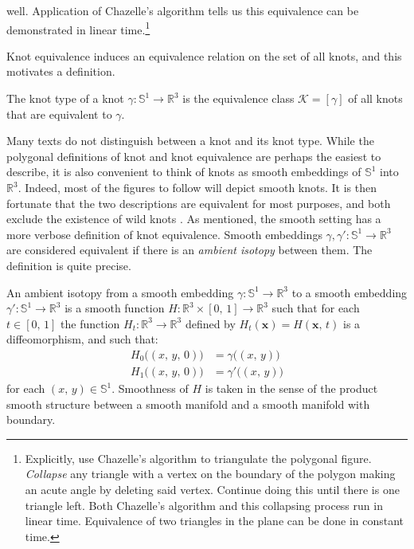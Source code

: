     well. Application of Chazelle's algorithm
    \cite{ChazelleTriangulationAlgorithm} tells us this equivalence
    can be demonstrated in linear time.\footnote{%
        Explicitly, use Chazelle's algorithm to triangulate the polygonal
        figure. \textit{Collapse} any triangle with a vertex on the boundary
        of the polygon making an acute angle by deleting said vertex.
        Continue doing this until there is one triangle left.
        Both Chazelle's algorithm and this collapsing
        process run in linear time. Equivalence of two triangles in the
        plane can be done in constant time.
    }
    \par\hfill\par
    Knot equivalence induces an equivalence relation on the set of all knots,
    and this motivates a definition.
    \begin{definition}
        The knot type of a knot $\gamma:\mathbb{S}^{1}\rightarrow\mathbb{R}^{3}$
        is the equivalence class $\mathcal{K}=[\gamma]$ of all knots that are
        equivalent to $\gamma$.
    \end{definition}
    Many texts do not distinguish between a knot and its knot type.
    While the polygonal definitions of knot and knot equivalence are perhaps
    the easiest to describe, it is also convenient to think of knots as smooth
    embeddings of $\mathbb{S}^{1}$ into $\mathbb{R}^{3}$. Indeed, most of the
    figures to follow will depict smooth knots. It is then fortunate that the
    two descriptions are equivalent for most purposes, and both exclude the
    existence of wild knots \cite[p.~147]{CrowellFoxKnotTheory}. As mentioned,
    the smooth setting has a more verbose definition of knot equivalence.
    Smooth embeddings $\gamma,\gamma':\mathbb{S}^{1}\rightarrow\mathbb{R}^{3}$
    are considered equivalent if there is an \textit{ambient isotopy}
    between them. The definition is quite precise.
    \begin{definition}
        An ambient isotopy from a smooth embedding
        $\gamma:\mathbb{S}^{1}\rightarrow\mathbb{R}^{3}$ to a smooth
        embedding $\gamma':\mathbb{S}^{1}\rightarrow\mathbb{R}^{3}$ is a
        smooth function
        $H:\mathbb{R}^{3}\times[0,\,1]\rightarrow\mathbb{R}^{3}$
        such that for each $t\in[0,\,1]$ the function
        $H_{t}:\mathbb{R}^{3}\rightarrow\mathbb{R}^{3}$ defined by
        $H_{t}(\mathbf{x})=H(\mathbf{x},\,t)$ is a diffeomorphism,
        and such that:
        \begin{subequations}
            \begin{align}
                H_{0}\big((x,\,y,\,0)\big)&=\gamma\big((x,\,y)\big)\\
                H_{1}\big((x,\,y,\,0)\big)&=\gamma'\big((x,\,y)\big)
            \end{align}
        \end{subequations}
        for each $(x,\,y)\in\mathbb{S}^{1}$. Smoothness of $H$ is taken in
        the sense of the product smooth structure between a smooth manifold and
        a smooth manifold with boundary.
    \end{definition}
